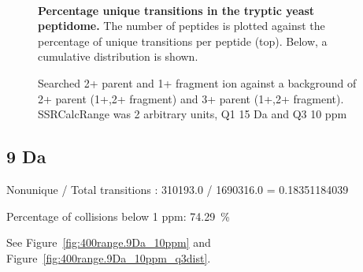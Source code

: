 \begin{figure}

\center
{} \\

\caption{ \textbf{Percentage unique transitions in the tryptic yeast peptidome.}
The number of peptides is plotted against the percentage of unique transitions
per peptide (top). Below, a cumulative distribution is shown.
}
\label{fig:400range.15Da_10ppm}
\end{figure}
\begin{figure}

\center
{}

\caption{
Searched 2+ parent and 1+ fragment ion against a background of 2+ parent (1+,2+ fragment) and 3+ parent (1+,2+ fragment).
SSRCalcRange was 2 arbitrary units, Q1 15 Da and Q3 10 ppm
}
\label{fig:400range.15Da_10ppm_q3dist}
\end{figure}


\subsection{9 Da}

Nonunique / Total transitions : 310193.0 / 1690316.0 = 0.18351184039

Percentage of collisions below 1 ppm: 74.29~\%


See Figure~\ref{fig:400range.9Da_10ppm} and Figure~\ref{fig:400range.9Da_10ppm_q3dist}.

